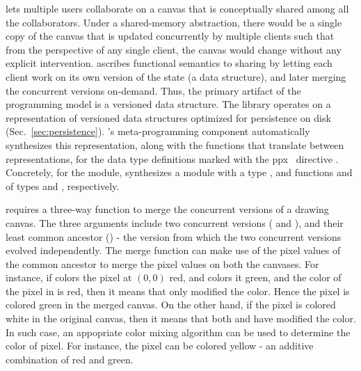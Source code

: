 \drawsome lets multiple users collaborate on a canvas that is
conceptually shared among all the collaborators. Under a shared-memory
abstraction, there would be a single copy of the canvas that is
updated concurrently by multiple clients such that from the
perspective of any single client, the canvas would change without any
explicit intervention. \name ascribes functional semantics to sharing
by letting each client work on its own version of the state (a data
structure), and later merging the concurrent versions on-demand. Thus,
the primary artifact of the \name programming model is a versioned
data structure. The library operates on a representation of versioned
data structures optimized for persistence on disk
(Sec.~\ref{sec:persistence}). \name's meta-programming component
automatically synthesizes this representation, along with the
functions that translate between representations, for the data type
definitions marked with the ppx~\cite{ppx} directive . Concretely, for the  module, \name synthesizes
a  module with a type , and functions
 and  of types  and , respectively.

\name requires a three-way  function to merge the concurrent
versions of a drawing canvas. The three arguments include two
concurrent versions ( and ), and their least common
ancestor () - the version from which the two concurrent
versions evolved independently. The merge function can make use of the
pixel values of the common ancestor to merge the pixel values on both
the canvases. For instance, if  colors the pixel at $(0,0)$ red,
and  colors it green, and the color of the pixel in  is
red, then it means that only  modified the color. Hence the
pixel is colored green in the merged canvas. On the other hand, if the
pixel is colored white in the original canvas, then it means that both
 and  have modified the color. In such case, an appopriate
color mixing algorithm can be used to determine the color of pixel.
For instance, the pixel can be colored yellow - an additive
combination of red and green.

